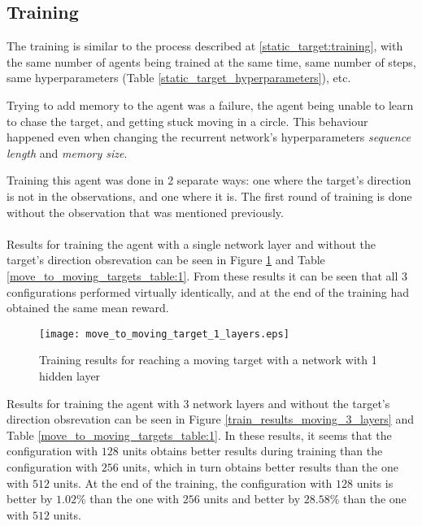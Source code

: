 \subsection{Training} \label{moving_target:training}
The training is similar to the process described at \ref{static_target:training}, with the same number of agents being trained at the same time, same number of steps, same hyperparameters (Table \ref{static_target_hyperparameters}), etc. 

Trying to add memory to the agent was a failure, the agent being unable to learn to chase the target, and getting stuck moving in a circle. This behaviour happened even when changing the recurrent network's hyperparameters \emph{sequence length} and \emph{memory size}. 

Training this agent was done in 2 separate ways: one where the target's direction is not in the observations, and one where it is. The first round of training is done without the observation that was mentioned previously.

\paragraph{}
Results for training the agent with a single network layer and without the target's direction obsrevation can be seen in Figure \ref{train_results_moving_1_layers} and Table \ref{move_to_moving_targets_table:1}. From these results it can be seen that all 3 configurations performed virtually identically, and at the end of the training had obtained the same mean reward.

\begin{figure}
    \begin{center}
        \texttt{[image: move\_to\_moving\_target\_1\_layers.eps]}
        \caption{Training results for reaching a moving target with a network with 1 hidden layer}
        \label{train_results_moving_1_layers}
    \end{center}
\end{figure}


Results for training the agent with 3 network layers and without the target's direction obsrevation can be seen in Figure \ref{train_results_moving_3_layers} and Table \ref{move_to_moving_targets_table:1}. In these results, it seems that the configuration with $128$ units obtains better results during training than the configuration with $256$ units, which in turn obtains better results than the one with $512$ units. At the end of the training, the configuration with $128$ units is better by $1.02\%$ than the one with $256$ units and better by $28.58\%$ than the one with $512$ units.

